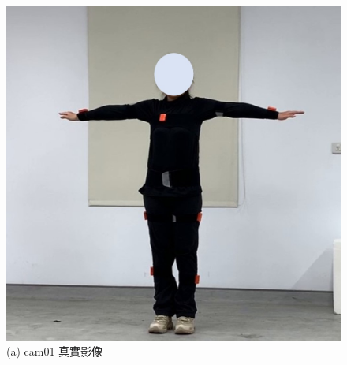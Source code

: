 \begin{figure}[!ht]
   \centering
   \begin{minipage}{.5\textwidth}
     \centering
     \includegraphics[width=.95\linewidth]{figure/ch4_fig_tpose_cam01_with2.jpg}
     \caption*{(a) cam01 真實影像}
   \end{minipage}%
   \begin{minipage}{.5\textwidth}

\end{minipage}
\end{figure}
